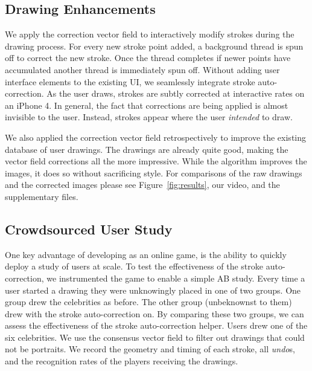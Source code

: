 \subsection {Drawing Enhancements}

We apply the correction vector field to interactively modify strokes during the drawing process. For every new stroke point added, a background thread is spun off to correct the new stroke. Once the thread completes if newer points have accumulated another thread is immediately spun off. Without adding user interface elements to the existing \daf UI, we seamlessly integrate stroke auto-correction. As the user draws, strokes are subtly corrected at interactive rates on an iPhone 4. In general, the fact that corrections are being applied is almost invisible to the user. Instead, strokes appear where the user {\em intended} to draw.


We also applied the correction vector field retrospectively to improve the existing database of user drawings. The drawings are already quite good, making the vector field corrections all the more impressive.  While the algorithm improves the images, it does so without sacrificing style. For comparisons of the raw drawings and the corrected images please see Figure~\ref{fig:results}, our video, and the supplementary files.

\subsection {Crowdsourced User Study}

One key advantage of developing \daf as an online game, is the ability to quickly deploy a study of users at scale. To test the effectiveness of the stroke auto-correction, we instrumented the game to enable a simple AB study. Every time a user started a drawing they were unknowingly placed in one of two groups. One group drew the celebrities as before. The other group (unbeknownst to them) drew with the stroke auto-correction on. By comparing these two groups, we can assess the effectiveness of the stroke auto-correction helper. Users drew one of the six celebrities. We use the consensus vector field to filter out drawings that could not be portraits. We record the geometry and timing of each stroke, all {\em undo}s, and the recognition rates of the players receiving the drawings.

